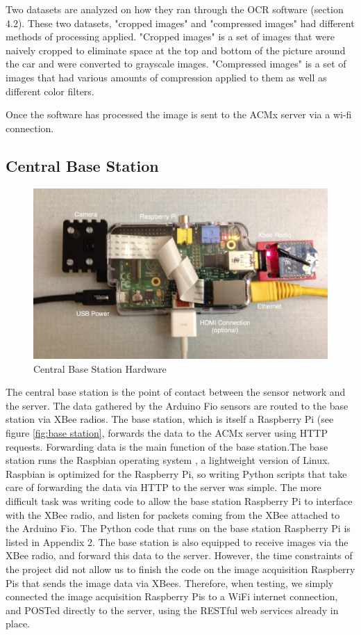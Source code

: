 \documentclass[11pt, oneside, fullpage, doublespace]{article}
\begin{document}
Two datasets are analyzed on how they ran through the OCR software (section 4.2). These two datasets, "cropped images" and "compressed images" had different methods of processing applied. "Cropped images" is a set of images that were naively cropped to eliminate space at the top and bottom of the picture around the car and were converted to grayscale images. "Compressed images" is a set of images that had various amounts of compression applied to them as well as different color filters.

Once the software has processed the image is sent to the ACMx server via a wi-fi connection.

\subsection{Central Base Station}
\begin{figure}
\begin{center}
\includegraphics[width=4.5in]{basestation}
\end{center}
\caption{Central Base Station Hardware}
\label{fig:basestation}
\end{figure}

The central base station is the point of contact between the sensor network and the server. The data gathered by the Arduino Fio sensors are routed to the base station via XBee radios. The base station, which is itself a Raspberry Pi (see figure \ref{fig:base station}, forwards the data to the ACMx server using HTTP requests. Forwarding data is the main function of the base station.The base station runs the Raspbian operating system \cite{raspbian}, a lightweight version of Linux. Raspbian is optimized for the Raspberry Pi, so writing Python scripts that take care of forwarding the data via HTTP to the server was simple. The more difficult task was writing code to allow the base station Raspberry Pi to interface with the XBee radio, and listen for packets coming from the XBee attached to the Arduino Fio. The Python code that runs on the base station Raspberry Pi is listed in Appendix 2. The base station is also equipped to receive images via the XBee radio, and forward this data to the server. However, the time constraints of the project did not allow us to finish the code on the image acquisition Raspberry Pis that sends the image data via XBees. Therefore, when testing, we simply connected the image acquisition Raspberry Pis to a WiFi internet connection, and POSTed directly to the server, using the RESTful web services already in place.
\end{document}
